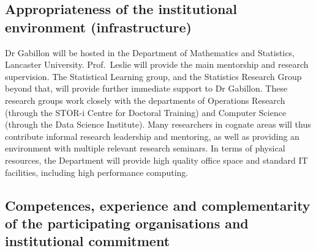 \documentclass[a4paper,11pt]{article}
\begin{document}
\begin{figure}[htbp]
\begin{center}
\end{center}
\end{figure}

\subsection{Appropriateness of the institutional environment (infrastructure)}
\label{sec:institution}


Dr Gabillon will be hosted in the Department of Mathematics and Statistics, Lancaster University.  Prof.\ Leslie will provide the main mentorship and research supervision.  The Statistical Learning group, and the Statistics Research Group beyond that, will provide further immediate support to Dr Gabillon. These research groups work closely with the departments of Operations Research (through the STOR-i Centre for Doctoral Training) and Computer Science (through the Data Science Institute).  Many researchers in cognate areas will thus contribute informal research leadership and mentoring, as well as providing an environment with multiple relevant research seminars.  In terms of physical resources, the Department will provide high quality office space and standard IT facilities, including high performance computing.%


\subsection{Competences, experience and complementarity of the participating organisations and institutional commitment}
\label{sec:competences}


\end{document}
